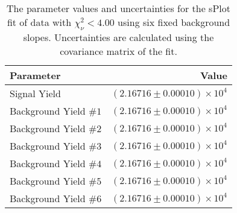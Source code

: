 
\begin{table}[ht]
    \begin{center}
        \begin{tabular}{lr}\toprule
            Parameter & Value \\\midrule
            Signal Yield & $(2.16716 \pm 0.00010) \times 10^{4}$ \\
            Background Yield $\#1$ & $(2.16716 \pm 0.00010) \times 10^{4}$ \\
            Background Yield $\#2$ & $(2.16716 \pm 0.00010) \times 10^{4}$ \\
            Background Yield $\#3$ & $(2.16716 \pm 0.00010) \times 10^{4}$ \\
            Background Yield $\#4$ & $(2.16716 \pm 0.00010) \times 10^{4}$ \\
            Background Yield $\#5$ & $(2.16716 \pm 0.00010) \times 10^{4}$ \\
            Background Yield $\#6$ & $(2.16716 \pm 0.00010) \times 10^{4}$ \\\bottomrule
        \end{tabular}
        \caption{The parameter values and uncertainties for the sPlot fit of data with $\chi^2_\nu < 4.00$ using six fixed background slopes. Uncertainties are calculated using the covariance matrix of the fit.}\label{tab:splot-fit-results-chisqdof-4.00-fixed-6}
    \end{center}
\end{table}
